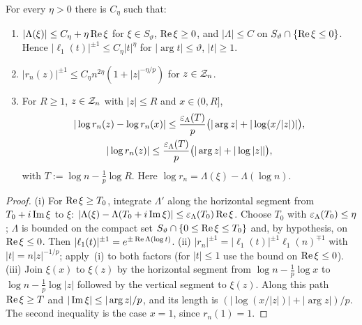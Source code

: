 \begin{lemma}\label{lem:pottersector}
For every $\eta>0$ there is $C_\eta$ such that:
\begin{enumerate}
\item[(i)] $|\Lambda(\xi)|\le C_\eta+\eta\operatorname{Re}\xi$ for $\xi\in S_\vartheta$, $\operatorname{Re}\xi\ge0$, and $|\Lambda|\le C$ on
  $S_\vartheta\cap\{\operatorname{Re}\xi\le0\}$. Hence $|\ell_1(t)|^{\pm1}\le C_\eta|t|^\eta$ for $|\arg t|\le\vartheta$,
  $|t|\ge1$.
\item[(ii)] $|r_n(z)|^{\pm1}\le C_\eta n^{2\eta}(1+|z|^{-\eta/p})$ for $z\in\mathcal{Z}_n$.
\item[(iii)] For $R\ge1$, $z\in\mathcal{Z}_n$ with $|z|\le R$ and $x\in(0,R]$,
  \begin{gather*}
    |\log r_n(z)-\log r_n(x)|\le\frac{\varepsilon_\Lambda(T)}p\bigl(|\arg z|+|\log(x/|z|)|\bigr),\\
    |\log r_n(z)|\le\frac{\varepsilon_\Lambda(T)}p\bigl(|\arg z|+|\log|z||\bigr),
  \end{gather*}
  with $T:=\log n-\frac1p\log R$. Here $\log r_n=\Lambda(\xi)-\Lambda(\log n)$.
\end{enumerate}
\end{lemma}

\begin{proof}
(i) For $\operatorname{Re}\xi\ge T_0$, integrate $\Lambda'$ along the horizontal segment from $T_0+i\operatorname{Im}\xi$ to $\xi$:
$|\Lambda(\xi)-\Lambda(T_0+i\operatorname{Im}\xi)|\le\varepsilon_\Lambda(T_0)\operatorname{Re}\xi$. Choose $T_0$ with $\varepsilon_\Lambda(T_0)\le\eta$; $\Lambda$ is
bounded on the compact set $S_\vartheta\cap\{0\le\operatorname{Re}\xi\le T_0\}$ and, by hypothesis, on $\operatorname{Re}\xi\le0$. Then
$|\ell_1(t)|^{\pm1}=e^{\pm\operatorname{Re}\Lambda(\log t)}$.
(ii) $|r_n|^{\pm1}=|\ell_1(t)|^{\pm1}\ell_1(n)^{\mp1}$ with $|t|=n|z|^{-1/p}$; apply~(i) to both factors (for $|t|\le1$ use
the bound on $\operatorname{Re}\xi\le0$).
(iii) Join $\xi(x)$ to $\xi(z)$ by the horizontal segment from $\log n-\frac1p\log x$ to $\log n-\frac1p\log|z|$
followed by the vertical segment to $\xi(z)$. Along this path $\operatorname{Re}\xi\ge T$ and $|\operatorname{Im}\xi|\le|\arg z|/p$, and its length
is $(|\log(x/|z|)|+|\arg z|)/p$. The second inequality is the case $x=1$, since $r_n(1)=1$.
\end{proof}

